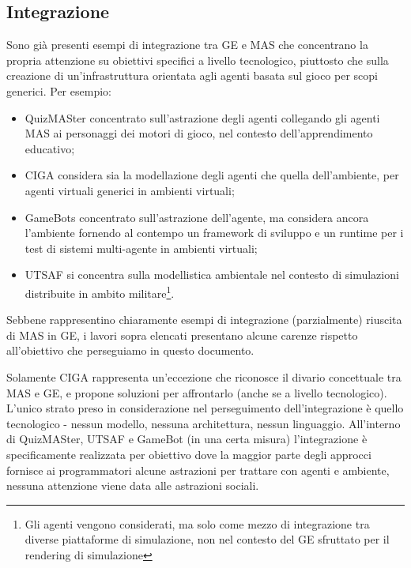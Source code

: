 \subsection{Integrazione}

Sono già presenti esempi di integrazione tra GE e MAS che concentrano la propria attenzione su obiettivi specifici a livello tecnologico, piuttosto che sulla creazione di un'infrastruttura orientata agli agenti basata sul gioco per scopi generici. Per esempio:
\begin{itemize}
    \item QuizMASter \cite{5763564} concentrato sull'astrazione degli agenti collegando gli agenti MAS ai personaggi dei motori di gioco, nel contesto dell'apprendimento educativo;
    \item CIGA \cite{ciga} considera sia la modellazione degli agenti che quella dell'ambiente, per agenti virtuali generici in ambienti virtuali;
    \item GameBots \cite{gamebots} concentrato sull'astrazione dell'agente, ma considera ancora l'ambiente fornendo al contempo un framework di sviluppo e un runtime per i test di sistemi multi-agente in ambienti virtuali;
    \item UTSAF \cite{utsaf} si concentra sulla modellistica ambientale nel contesto di simulazioni distribuite in ambito militare\footnote{Gli agenti vengono considerati, ma solo come mezzo di integrazione tra diverse piattaforme di simulazione, non nel contesto del GE sfruttato per il rendering di simulazione}.
\end{itemize}

Sebbene rappresentino chiaramente esempi di integrazione (parzialmente) riuscita di MAS in GE, i lavori sopra elencati presentano alcune carenze rispetto all'obiettivo che perseguiamo in questo documento.

\smallskip

Solamente CIGA rappresenta un'eccezione che riconosce il divario concettuale tra MAS e GE, e propone soluzioni per affrontarlo (anche se a livello tecnologico). L'unico strato preso in considerazione nel perseguimento dell'integrazione è quello tecnologico - nessun modello, nessuna architettura, nessun linguaggio. All'interno di QuizMASter, UTSAF e GameBot (in una certa misura) l'integrazione è specificamente realizzata per obiettivo dove la maggior parte degli approcci fornisce ai programmatori alcune astrazioni per trattare con agenti e ambiente, nessuna attenzione viene data alle astrazioni sociali.\cite{gamemas-woa2016}

